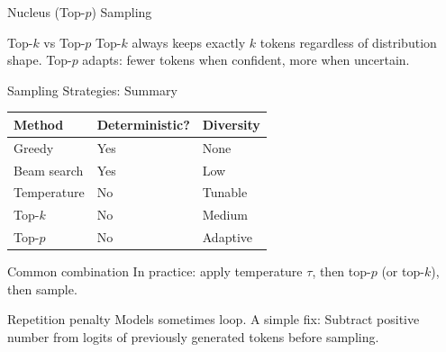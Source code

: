 \begin{frame}{Nucleus (Top-$p$) Sampling}
  \vspace{0.5em}
  \begin{block}{Top-$k$ vs Top-$p$}
    Top-$k$ always keeps exactly $k$ tokens regardless of distribution shape.
    Top-$p$ adapts: fewer tokens when confident, more when uncertain.
  \end{block}
\end{frame}

\begin{frame}{Sampling Strategies: Summary}
  \begin{center}
    \begin{tabular}{lll}
      \textbf{Method} & \textbf{Deterministic?} & \textbf{Diversity}  \\ \hline
      Greedy        & Yes & None    \\
      Beam search   & Yes & Low     \\
      Temperature   & No  & Tunable \\
      Top-$k$       & No  & Medium  \\
      Top-$p$       & No  & Adaptive\\
    \end{tabular}
  \end{center}

  \vspace{0.8em}
  \begin{block}{Common combination}
    In practice: apply temperature $\tau$, then top-$p$ (or top-$k$), then sample.
  \end{block}

  \vspace{0.5em}
  \begin{alertblock}{Repetition penalty}
    Models sometimes loop. A simple fix: Subtract positive number from logits of previously generated tokens before sampling.
  \end{alertblock}
\end{frame}
